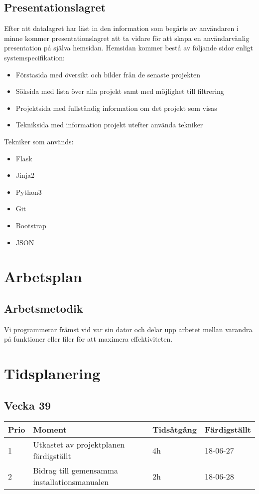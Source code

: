 \documentclass{TDP003mall}
\begin{document}
\subsection{Presentationslagret}
Efter att datalagret har läst in den information som begärts av användaren
i minne kommer presentationslagret att ta vidare för att skapa en
användarvänlig presentation på själva hemsidan. Hemsidan kommer bestå av
följande sidor enligt systemspecifikation:
\begin{itemize}
\item Förstasida med översikt och bilder från de senaste projekten
\item Söksida med lista över alla projekt samt med möjlighet till filtrering
\item Projektsida med fullständig information om det projekt som visas
\item Tekniksida med information projekt utefter använda tekniker
\end{itemize}
Tekniker som används:
\begin{itemize}
\item Flask
\item Jinja2
\item Python3
\item Git
\item Bootstrap
\item JSON
\end{itemize}
\section{Arbetsplan}
\subsection{Arbetsmetodik}
Vi programmerar främst vid var sin dator och delar upp arbetet mellan
varandra på funktioner eller filer för att maximera effektiviteten.
\section{Tidsplanering}

\subsection{Vecka 39}
\begin{table}[!h]
\begin{tabularx}{\linewidth}{|l|X|l|l|}
\hline
\textbf{Prio} & \textbf{Moment} & \textbf{Tidsåtgång} & \textbf{Färdigställt}\\\hline
1& Utkastet av projektplanen färdigställt & 4h	& 18-06-27 \\\hline
2& Bidrag till gemensamma installationsmanualen & 2h &  18-06-28 \\\hline

\end{tabularx}
\end{table}
\newpage
\end{document}
